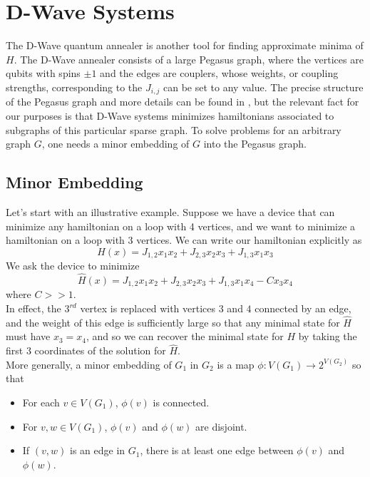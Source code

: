 \documentclass[12pt]{article}
\newcommand{\1}{\mathbf{1}}
\theoremstyle{remark}
\theoremstyle{definition}
\theoremstyle{proposition}
\theoremstyle{lemma}
\theoremstyle{definition}
\begin{document}
	\section{D-Wave Systems}
	\indent \indent The D-Wave quantum annealer is another tool for finding approximate minima of $H$. The D-Wave annealer consists of a large Pegasus graph, where the vertices are qubits with spins $\pm 1$ and the edges are couplers, whose weights, or coupling strengths, corresponding to the $J_{i, j}$ can be set to any value. The precise structure of the Pegasus graph and more details can be found in \cite{dattani2019pegasus}, but the relevant fact for our purposes is that D-Wave systems minimizes  hamiltonians associated to subgraphs of this particular sparse graph. To solve problems for an arbitrary graph $G$, one needs a minor embedding of $G$ into the Pegasus graph.
	
	\subsection{Minor Embedding}
	\indent \indent Let's start with an illustrative example. Suppose we have a device that can minimize any hamiltonian on a loop with 4 vertices, and we want to minimize a hamiltonian on a loop with 3 vertices. We can write our hamiltonian explicitly as
	$$H(x) = J_{1, 2} x_1x_2 + J_{2, 3} x_2x_3  + J_{1, 3}x_1x_3$$
	We ask the device to minimize
	$$\hat{H}(x) = J_{1, 2} x_1x_2 + J_{2, 3}x_2x_3 + J_{1,3}x_1x_4 - Cx_3x_4$$
	where $C >> 1$. \\
	In effect,  the $3^{rd}$ vertex is replaced with vertices $3$ and $4$ connected by an edge, and the weight of this edge is sufficiently large so that any minimal state for $\hat{H}$ must have $x_3 = x_4$, and so we can recover the minimal state for $H$ by taking the first 3 coordinates of the solution for $\hat{H}$. \\
	\indent More generally, a minor embedding of $G_1$ in $G_2$ is a map $\phi: V(G_1) \rightarrow 2^{V(G_2)}$ so that 
	
	\begin{itemize}
		\item For each $v \in V(G_1)$, $\phi(v)$ is connected.
		\item For $v, w \in V(G_1)$, $\phi(v)$ and $\phi(w)$ are disjoint.
		\item If $(v, w)$ is an edge in $G_1$, there is at least one edge between $\phi(v)$ and $\phi(w)$.
		\end{itemize}
	
\end{document}
